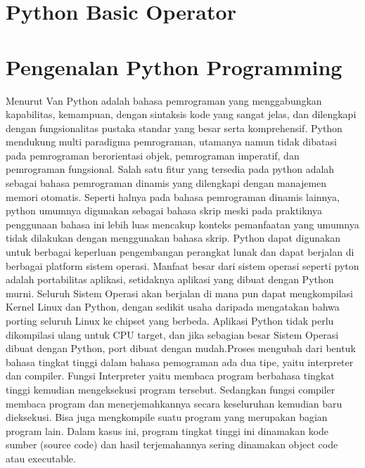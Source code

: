 
\section{Python Basic Operator}
\section{Pengenalan Python Programming}
Menurut Van Python adalah bahasa pemrograman yang menggabungkan kapabilitas, kemampuan, dengan sintaksis kode yang sangat jelas, dan dilengkapi dengan fungsionalitas pustaka standar yang besar serta komprehensif. Python mendukung multi paradigma pemrograman, utamanya namun tidak dibatasi pada pemrograman berorientasi objek, pemrograman imperatif, dan pemrograman fungsional. Salah satu fitur yang tersedia pada python adalah sebagai bahasa pemrograman dinamis yang dilengkapi dengan manajemen memori otomatis. Seperti halnya pada bahasa pemrograman dinamis lainnya, python umumnya digunakan sebagai bahasa skrip meski pada praktiknya penggunaan bahasa ini lebih luas mencakup konteks pemanfaatan yang umumnya tidak dilakukan dengan menggunakan bahasa skrip. Python dapat digunakan untuk berbagai keperluan pengembangan perangkat lunak dan dapat berjalan di berbagai platform sistem operasi. Manfaat besar dari sistem operasi seperti pyton adalah portabilitas aplikasi, setidaknya aplikasi yang dibuat dengan Python murni. Seluruh Sistem Operasi akan berjalan di mana pun dapat mengkompilasi Kernel Linux dan Python, dengan sedikit usaha daripada mengatakan bahwa porting seluruh Linux ke chipset yang berbeda. Aplikasi Python tidak perlu dikompilasi ulang untuk CPU target, dan jika sebagian besar Sistem Operasi dibuat dengan Python, port dibuat dengan mudah.Proses mengubah dari bentuk bahasa tingkat tinggi dalam bahasa pemograman ada dua tipe, yaitu interpreter dan compiler. Fungsi Interpreter yaitu membaca program berbahasa tingkat tinggi kemudian mengeksekusi program tersebut. Sedangkan fungsi compiler membaca program dan menerjemahkannya secara keseluruhan kemudian baru dieksekusi. Bisa juga mengkompile suatu program yang merupakan bagian program lain. Dalam kasus ini, program tingkat tinggi ini dinamakan kode sumber (source code) dan hasil terjemahannya sering dinamakan object code atau executable.  \cite{van2007python}

